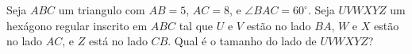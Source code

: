Seja $ABC$ um triangulo com $AB=5$, $AC=8$, e $\angle BAC=60^\circ$.
Seja $UVWXYZ$ um hexágono regular inscrito em $ABC$ tal que $U$ e $V$ estão no lado $BA$, $W$ e $X$ estão no lado $AC$, e $Z$ está no lado $CB$. Qual é o tamanho do lado de $UVWXYZ$?
